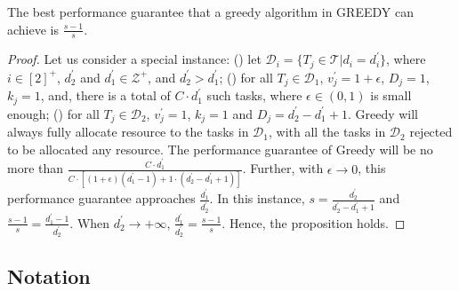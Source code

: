 \documentclass[10pt,journal,compsoc]{IEEEtran}
\newcommand{\rmnum}[1]{\romannumeral #1}
\begin{document}
\begin{proposition}\label{bound-greedy}
The best performance guarantee that a greedy algorithm in GREEDY can achieve is $\frac{s-1}{s}$.
\end{proposition}
\begin{proof}
Let us consider a special instance: (\rmnum{1}) let $\mathcal{D}_{i}=\{T_{j}\in\mathcal{T} | d_{i}=d_{i}^{\prime} \}$, where $i\in [2]^{+}$, $d_{2}^{\prime}$ and $d_{1}^{\prime}\in \mathcal{Z}^{+}$, and $d_{2}^{\prime}>d_{1}^{\prime}$; (\rmnum{2}) for all $T_{j}\in\mathcal{D}_{1}$, $v_{j}^{\prime}=1+\epsilon$, $D_{j}=1$,
$k_{j}=1$, and, there is a total of $C\cdot d_{1}^{\prime}$ such tasks, where $\epsilon \in (0, 1)$ is small enough; (\rmnum{3}) for all $T_{j}\in\mathcal{D}_{2}$, $v_{j}^{\prime}=1$, $k_{j}=1$ and $D_{j}=d_{2}^{\prime}-d_{1}^{\prime}+1$. Greedy will always fully allocate resource to the tasks in $\mathcal{D}_{1}$, with all the tasks in $\mathcal{D}_{2}$ rejected to be allocated any resource. The performance guarantee of Greedy will be no more than $\frac{C\cdot d_{1}^{\prime}}{C\cdot[(1+\epsilon)(d_{1}^{\prime}-1)+1\cdot (d_{2}^{\prime}-d_{1}^{\prime}+1)]}$. Further, with $\epsilon\rightarrow 0$, this performance guarantee approaches $\frac{d_{1}^{\prime}}{d_{2}^{\prime}}$. In this instance, $s=\frac{d_{2}^{\prime}}{d_{2}^{\prime}-d_{1}^{\prime}+1}$ and $\frac{s-1}{s}=\frac{d_{1}^{\prime}-1}{d_{2}^{\prime}}$. When $d_{2}^{\prime}\rightarrow +\infty$, $\frac{d_{1}^{\prime}}{d_{2}^{\prime}}=\frac{s-1}{s}$. Hence, the proposition holds.
\end{proof}

\subsection{Notation}
\end{document}
